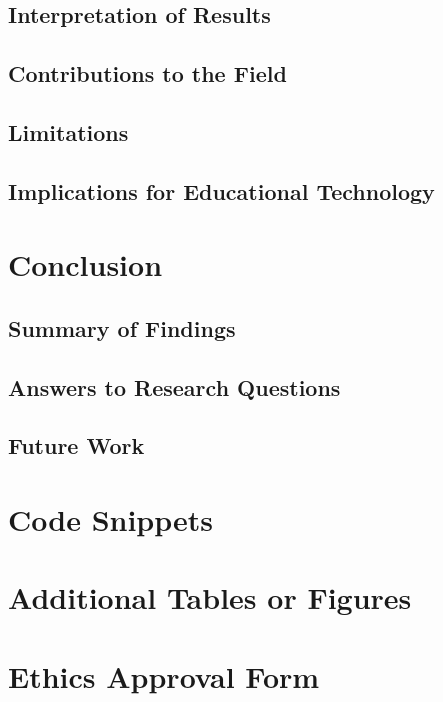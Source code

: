 \documentclass[10pt]{report}
\begin{document}
\section{Interpretation of Results}
\section{Contributions to the Field}
\section{Limitations}
\section{Implications for Educational Technology}


\chapter{Conclusion}
\section{Summary of Findings}
\section{Answers to Research Questions}
\section{Future Work}

\printbibliography


\appendix

\chapter{Code Snippets}

\chapter{Additional Tables or Figures}
\chapter{Ethics Approval Form}
\end{document}
